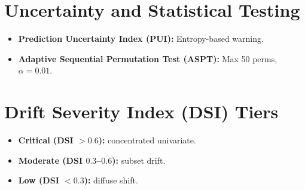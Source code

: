 \documentclass{muthesis2021}
\begin{document}
\section{Uncertainty and Statistical Testing}
\begin{itemize}
    \item \textbf{Prediction Uncertainty Index (PUI):} Entropy-based warning.
    \item \textbf{Adaptive Sequential Permutation Test (ASPT):} Max 50 perms, $\alpha=0.01$.
\end{itemize}

\section{Drift Severity Index (DSI) Tiers}
\begin{itemize}
    \item \textbf{Critical (DSI $> 0.6$):} concentrated univariate.
    \item \textbf{Moderate (DSI $0.3$--$0.6$):} subset drift.
    \item \textbf{Low (DSI $< 0.3$):} diffuse shift.
\end{itemize}




\biography
\end{document}
